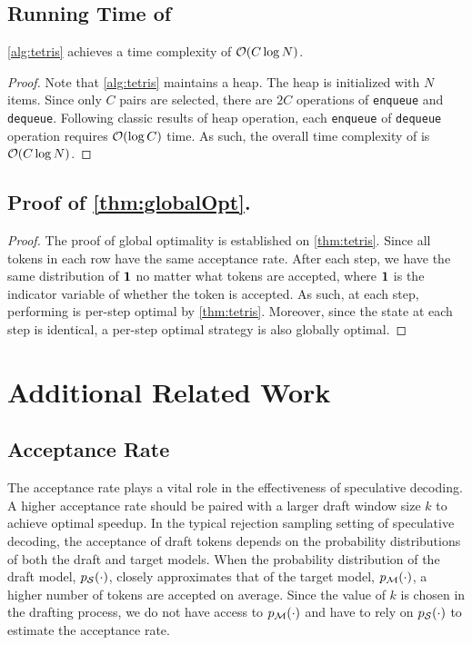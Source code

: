 \subsection{Running Time of \alg{}}
\label{app:lem_time_comp}

\begin{lem}
\label{lem:time_comp}
\cref{alg:tetris} achieves a time complexity of ${\mathcal{O}}(C\log N)$.

\begin{proof}
    Note that \cref{alg:tetris} maintains a heap. The heap is initialized with $N$ items. Since only $C$ pairs are selected, there are $2C$ operations of \texttt{enqueue} and \texttt{dequeue}. Following classic results of heap operation, each \texttt{enqueue} of \texttt{dequeue} operation requires ${\mathcal{O}}(\log C)$ time. As such, the overall time complexity of \alg{} is ${\mathcal{O}}(C\log N)$.
\end{proof}
\end{lem}

\subsection{Proof of \texorpdfstring{\cref{thm:globalOpt}}{Theorem 2}.}
\label{app:thm_global_opt_tetris}

\globalOpt*
\begin{proof}
    The proof of global optimality is established on \cref{thm:tetris}. Since all tokens in each row have the same acceptance rate. After each step, we have the same distribution of ${\bm{1}}$ no matter what tokens are accepted, where ${\bm{1}}$ is the indicator variable of whether the token is accepted.
    As such, at each step, performing \alg{} is per-step optimal by \cref{thm:tetris}. Moreover, since the state at each step is identical, a per-step optimal strategy is also globally optimal.
\end{proof}


\section{Additional Related Work}

\subsection{Acceptance Rate}\label{app:acceptance-related-work}

The acceptance rate plays a vital role in the effectiveness of speculative decoding.
A higher acceptance rate should be paired with a larger draft window size $k$ to achieve optimal speedup.
In the typical rejection sampling setting of speculative decoding, the acceptance of draft tokens depends on the probability distributions of both the draft and target models.
When the probability distribution of the draft model, $p_{\mathcal{S}}(\cdot)$, closely approximates that of the target model, $p_{\mathcal{M}}(\cdot)$, a higher number of tokens are accepted on average.
Since the value of $k$ is chosen in the drafting process, we do not have access to $p_{\mathcal{M}}(\cdot)$ and have to rely on $p_{\mathcal{S}}(\cdot)$ to estimate the acceptance rate.

